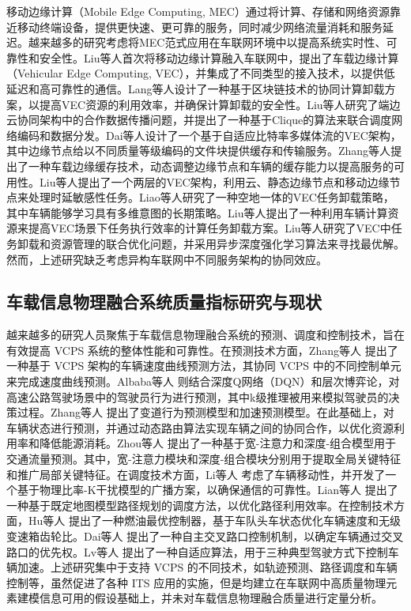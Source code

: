 移动边缘计算（Mobile Edge Computing, MEC）\cite{mao2017a}通过将计算、存储和网络资源靠近移动终端设备，提供更快速、更可靠的服务，同时减少网络流量消耗和服务延迟。越来越多的研究考虑将MEC范式应用在车联网环境中以提高系统实时性、可靠性和安全性。Liu等人\cite{liu2017a}首次将移动边缘计算融入车联网中，提出了车载边缘计算（Vehicular Edge Computing, VEC），并集成了不同类型的接入技术，以提供低延迟和高可靠性的通信。Lang等人\cite{lang2022cooperative}设计了一种基于区块链技术的协同计算卸载方案，以提高VEC资源的利用效率，并确保计算卸载的安全性。Liu等人\cite{liu2021fog}研究了端边云协同架构中的合作数据传播问题，并提出了一种基于Clique的算法来联合调度网络编码和数据分发。Dai等人\cite{dai2021edge}设计了一个基于自适应比特率多媒体流的VEC架构，其中边缘节点给以不同质量等级编码的文件块提供缓存和传输服务。Zhang等人\cite{zhang2022digital}提出了一种车载边缘缓存技术，动态调整边缘节点和车辆的缓存能力以提高服务的可用性。Liu等人\cite{liu2020adaptive}提出了一个两层的VEC架构，利用云、静态边缘节点和移动边缘节点来处理时延敏感性任务。Liao等人\cite{liao2021learning}研究了一种空地一体的VEC任务卸载策略，其中车辆能够学习具有多维意图的长期策略。Liu等人\cite{liu2023mobility}提出了一种利用车辆计算资源来提高VEC场景下任务执行效率的计算任务卸载方案。Liu等人\cite{liu2023asynchronous}研究了VEC中任务卸载和资源管理的联合优化问题，并采用异步深度强化学习算法来寻找最优解。然而，上述研究缺乏考虑异构车联网中不同服务架构的协同效应。

\subsection{车载信息物理融合系统质量指标研究与现状}

越来越多的研究人员聚焦于车载信息物理融合系统的预测、调度和控制技术，旨在有效提高 VCPS 系统的整体性能和可靠性。在预测技术方面，Zhang等人 \cite{zhang2021a} 提出了一种基于 VCPS 架构的车辆速度曲线预测方法，其协同 VCPS 中的不同控制单元来完成速度曲线预测。Albaba等人 \cite{albaba2021driver} 则结合深度Q网络（DQN）和层次博弈论，对高速公路驾驶场景中的驾驶员行为进行预测，其中k级推理被用来模拟驾驶员的决策过程。Zhang等人 \cite{zhang2020data} 提出了变道行为预测模型和加速预测模型。在此基础上，对车辆状态进行预测，并通过动态路由算法实现车辆之间的协同合作，以优化资源利用率和降低能源消耗。Zhou等人 \cite{zhou2021wide} 提出了一种基于宽-注意力和深度-组合模型用于交通流量预测。其中，宽-注意力模块和深度-组合模块分别用于提取全局关键特征和推广局部关键特征。在调度技术方面，Li等人 \cite{li2020cyber} 考虑了车辆移动性，并开发了一个基于物理比率-K干扰模型的广播方案，以确保通信的可靠性。Lian等人 \cite{lian2021cyber} 提出了一种基于既定地图模型路径规划的调度方法，以优化路径利用效率。在控制技术方面，Hu等人 \cite{hu2017cyber} 提出了一种燃油最优控制器，基于车队头车状态优化车辆速度和无级变速箱齿轮比。Dai等人 \cite{dai2016a} 提出了一种自主交叉路口控制机制，以确定车辆通过交叉路口的优先权。Lv等人 \cite{lv2018driving} 提出了一种自适应算法，用于三种典型驾驶方式下控制车辆加速。上述研究集中于支持 VCPS 的不同技术，如轨迹预测、路径调度和车辆控制等，虽然促进了各种 ITS 应用的实施，但是均建立在车联网中高质量物理元素建模信息可用的假设基础上，并未对车载信息物理融合质量进行定量分析。

